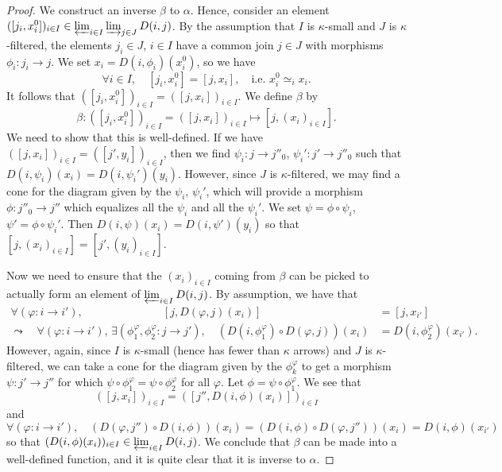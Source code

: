 \begin{proof}
We construct an inverse \(\beta\) to \(\alpha\). Hence, consider an element \(([j_i,x_i^0])_{i\in I}\in\projlim_{i\in I}\injlim_{j\in J}D(i,j)\). By the assumption that \(I\) is \(\kappa\)-small
and \(J\) is \(\kappa\)-filtered, the elements \(j_i\in J\), \(i\in I\) have a common join \(j\in J\) with morphisms \(\phi_i\!:j_i\to j\). We set \(x_i = D(i,\phi_i)(x_i^0)\), so we have
\[ \forall i\in I,\quad [j_i,x_i^0] = [j,x_i],\quad \text{i.e.\ } x_i^0 \simeq_i x_i. \]
It follows that \(([j_i,x_i^0])_{i\in I} = ([j,x_i])_{i\in I}\). We define \(\beta\) by
\[ \beta\!: ([j_i,x_i^0])_{i\in I} = ([j,x_i])_{i\in I} \mapsto [j,(x_i)_{i\in I}]. \]
We need to show that this is well-defined. If we have \(([j,x_i])_{i\in I} = ([j',y_i])_{i\in I}\), then we find \(\psi_i\!:j\to j''_0\), \(\psi_i'\!:j'\to j''_0\) such that
\(D(i,\psi_i)(x_i) = D(i,\psi_i')(y_i)\). However, since \(J\) is \(\kappa\)-filtered, we may find a cone for the diagram given by the \(\psi_i\), \(\psi_i'\), which will provide a morphism
\(\phi\!:j''_0 \to j'' \) which equalizes all the \(\psi_i\) and all the \(\psi_i'\). We set \(\psi = \phi\circ\psi_i\), \(\psi' = \phi\circ\psi_i'\). Then \(D(i,\psi)(x_i) = D(i,\psi')(y_i)\)
so that \([j,(x_i)_{i\in I}] = [j',(y_i)_{i\in I}]\).

Now we need to ensure that the \((x_i)_{i\in I}\) coming from \(\beta\) can be picked to actually form an element of \(\projlim_{i\in I}D(i,j)\). By assumption, we have that
\begin{align*}
	\forall (\varphi\!:i\to i'),\hspace{3cm} [j, D(\varphi,j)(x_i)] &= [j,x_{i'}] \\
	\leadsto\quad \forall (\varphi\!:i\to i'),\, \exists (\phi^{\varphi}_1,\phi^{\varphi}_2\!: j\to j'),\quad (D(i,\phi^\varphi_1)\circ D(\varphi,j))(x_i) &= D(i,\phi^\varphi_2)(x_{i'}).
\end{align*}
However, again, since \(I\) is \(\kappa\)-small (hence has fewer than \(\kappa\) arrows) and \(J\) is \(\kappa\)-filtered, we can take a cone for the diagram given by the \(\phi^\varphi_k\)
to get a morphism \(\psi\!:j'\to j''\) for which \(\psi\circ\phi^\varphi_1 = \psi\circ\phi^\varphi_2\) for all \(\varphi\). Let \(\phi = \psi\circ\phi_1^\varphi\). We see that
\[ ([j,x_i])_{i\in I} = ([j'',D(i,\phi)(x_i)])_{i\in I} \]
and
\[ \forall (\varphi\!:i\to i'),\quad (D(\varphi,j'')\circ D(i,\phi))(x_i) = (D(i,\phi)\circ D(\varphi,j''))(x_i) = D(i,\phi)(x_{i'}) \]
so that \((D(i,\phi)(x_i))_{i\in I}\in\projlim_{i\in I}D(i,j)\). We conclude that \(\beta\) can be made into a well-defined function, and it is quite clear that it
is inverse to \(\alpha\).
\end{proof}

